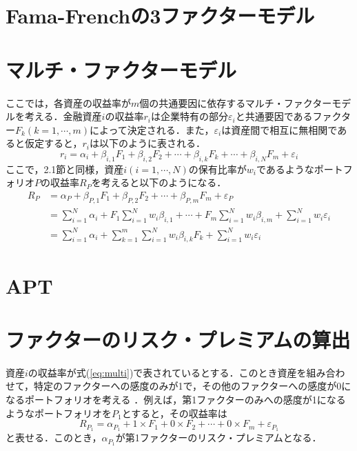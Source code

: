 \documentclass[11pt]{jreport}
\begin{document}
\section{Fama-Frenchの3ファクターモデル}

\section{マルチ・ファクターモデル}
ここでは，各資産の収益率が$m$個の共通要因に依存するマルチ・ファクターモデルを考える．金融資産$i$の収益率$r_i$は企業特有の部分$\varepsilon_i$と共通要因であるファクター$F_k(k=1,\cdots,m)$によって決定される．また，$\varepsilon_i$は資産間で相互に無相関であると仮定すると，$r_i$は以下のように表される．
\begin{equation}
r_i = \alpha_i + \beta_{i,1}F_1 + \beta_{i,2}F_2 + \cdots + \beta_{i,k}F_k + \cdots + \beta_{i,N}F_m + \varepsilon_i
\end{equation}
ここで，2.1節と同様，資産$i(i=1,\cdots,N)$の保有比率が$w_i$であるようなポートフォリオ$P$の収益率$R_P$を考えると以下のようになる．
\begin{equation}
\begin{split}
R_P &= \alpha_P + \beta_{P,1} F_1 + \beta_{P,2} F_2 + \cdots + \beta_{P,m} F_m + \varepsilon_P\\
&=\sum_{i=1}^N \alpha_i + F_1 \sum_{i=1}^N w_i \beta_{i,1} + \cdots + F_m \sum_{i=1}^N w_i \beta_{i,m} + \sum_{i=1}^N w_i\varepsilon_i\\
&= \sum_{i=1}^N \alpha_i + \sum_{k=1}^m \sum_{i=1}^N w_i \beta_{i,k} F_k + \sum_{i=1}^N w_i\varepsilon_i
\label{eq:multi}
\end{split}
\end{equation}

\section{APT}
\section{ファクターのリスク・プレミアムの算出}
資産$i$の収益率が式(\ref{eq:multi})で表されているとする．このとき資産を組み合わせて，特定のファクターへの感度のみが1で，その他のファクターへの感度が0になるポートフォリオを考える ．例えば，第1ファクターのみへの感度が1になるようなポートフォリオを$P_1$とすると，その収益率は
\begin{equation}
R_{P_1} = \alpha_{P_1} + 1\times F_1 + 0\times F_2 + \cdots + 0\times F_m + \varepsilon_{P_1} 
\end{equation}
と表せる．このとき，$\alpha_{P_1}$が第1ファクターのリスク・プレミアムとなる．
\end{document}
